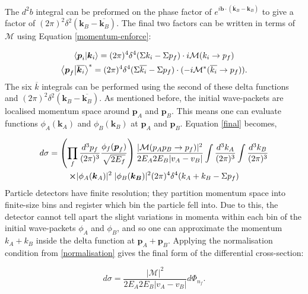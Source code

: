 \documentclass[a4paper,11pt]{article}
\begin{document}
The $d^2b$ integral can be preformed on the phase factor of $e^{i\boldsymbol{b}\cdot(\overline{\boldsymbol{k}}_B - \boldsymbol{k}_B)}$ to give a factor of $(2\pi)^2\delta^2(\boldsymbol{k}_B - \overline{\boldsymbol{k}_B})$. The final two factors can be written in terms of $\mathcal{M}$ using Equation \ref{momentum-enforce}:
 
\begin{gather*}
	\bra{\boldsymbol{p}_i}\ket{\boldsymbol{k}_i} = (2\pi)^4 \delta^4(\Sigma k_i - \Sigma p_f) \cdot i\mathcal{M}(k_i \rightarrow p_f)\\
	\bra{\boldsymbol{p}_f}\ket{\overline{\boldsymbol{k}_i}}^* = (2\pi)^4 \delta^4(\Sigma \overline{k_i} - \Sigma p_f) \cdot (-i\mathcal{M^*}(\overline{k_i}\rightarrow p_f)).	
\end{gather*}
The six $\overline{k}$ integrals can be performed using the second of these delta functions and $(2\pi)^2\delta^2(\boldsymbol{k}_B - \overline{\boldsymbol{k}_B})$. As mentioned before, the initial wave-packets are localised momentum space around $\boldsymbol{p}_A$ and $\boldsymbol{p}_B$. This means one can evaluate functions $\phi_A(\boldsymbol{k}_A)$ and  $\phi_B(\boldsymbol{k}_B)$ at $\boldsymbol{p}_A$ and $\boldsymbol{p}_B$. Equation \ref{final} becomes,

\begin{gather*}
		d\sigma = \left(\prod_{f} \frac{d^3p_f}{(2\pi)^3} \frac{\phi_f(\boldsymbol{p}_f)}{\sqrt{2E_f}}\right)  \frac{|\mathcal{M}(p_Ap_B \rightarrow p_f)|^2}{2E_A2E_B|v_A-v_B|}\int \frac{d^3k_A}{(2\pi)^3}\int \frac{d^3k_B}{(2\pi)^3} \\
		\cross |\phi_A(\boldsymbol{k}_A)|^2\;|\phi_B(\boldsymbol{k_B})|^2 (2\pi)^4 \delta^4(k_A +k_B -\Sigma p_f)
\end{gather*}
Particle detectors have finite resolution; they partition momentum space into finite-size bins and register which bin the particle fell into. Due to this, the detector cannot tell apart the slight variations in momenta within each bin of the initial wave-packets $\phi_A$ and $\phi_B$, and so one can approximate the momentum $k_A + k_B$ inside the delta function at $\boldsymbol{p}_A + \boldsymbol{p}_B$. Applying the normalisation condition from \ref{normalisation} gives the final form of the differential cross-section:

\begin{equation}\label{general_cross}
	d\sigma  =\frac{|\mathcal{M}|^2}{2E_A 2E_B |v_A - v_B|}d\Phi_{n_f}.
\end{equation}
\end{document}
